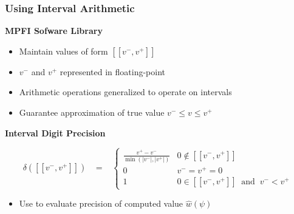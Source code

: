 \documentclass[t,pdf]{beamer}
\newcommand{\approximate}[1]{\hat{#1}}
\newcommand{\approxw}{\approximate{w}}
\newcommand{\aerror}{\delta}
\newcommand{\vmin}{v^{-}}
\newcommand{\vmax}{v^{+}}
\newcommand{\interval}[1]{[\![#1]\!]}
\begin{document}
\begin{frame}

\frametitle{Using Interval Arithmetic}

\medskip

\textbf{MPFI Sofware Library}
\begin{itemize}
\item Maintain values of form $\interval{\vmin, \vmax}$
\item $\vmin$ and $\vmax$ represented in floating-point
\item Arithmetic operations generalized to operate on intervals
\item Guarantee approximation of true value $v^{-} \leq v \leq v^{+}$
\end{itemize}

\bigskip

\textbf{Interval Digit Precision}

\begin{displaymath}
\aerror(\interval{\vmin, \vmax}) \;\;\; = \;\;\; \left\{ \begin{array}{ll}
  \frac{\vmax - \vmin}{\min(|\vmin|, |\vmax|)}  & 0 \not \in \interval{\vmin, \vmax}\\[0.8em]
  0 & \vmin = \vmax = 0 \\
  1 & 0 \in \interval{\vmin, \vmax} \;\; \textrm{and} \;\; \vmin < \vmax
  \end{array} \right. \label{eqn:interval:error}
\end{displaymath}

\begin{itemize}
  \item Use to evaluate precision of computed value $\approxw(\psi)$
\end{itemize}

\end{frame}
\end{document}
